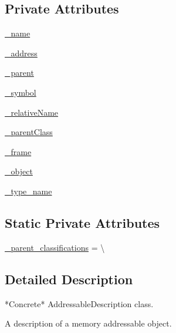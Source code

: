 \subsection*{Private Attributes}
\begin{DoxyCompactItemize}
\item 
\hyperlink{classmemoryoracle_1_1descriptions_1_1AddressableDescription_a6e606b2cd417f62a633e8388fe713815}{\+\_\+name}
\item 
\hyperlink{classmemoryoracle_1_1descriptions_1_1AddressableDescription_a2629ea28eb8de674ac1c22d1ed85c640}{\+\_\+address}
\item 
\hyperlink{classmemoryoracle_1_1descriptions_1_1AddressableDescription_afc0dda5186169a237d82c5de7cdafb8a}{\+\_\+parent}
\item 
\hyperlink{classmemoryoracle_1_1descriptions_1_1AddressableDescription_a635fff407d54c5be7078ae19ab1a70e5}{\+\_\+symbol}
\item 
\hyperlink{classmemoryoracle_1_1descriptions_1_1AddressableDescription_a621a9132072849bbf645372f7262cf5d}{\+\_\+relative\+Name}
\item 
\hyperlink{classmemoryoracle_1_1descriptions_1_1AddressableDescription_a0dfa40ff7ce8f74eacb3a603a272a720}{\+\_\+parent\+Class}
\item 
\hyperlink{classmemoryoracle_1_1descriptions_1_1AddressableDescription_a46200a5bb0d40546f0414821b1bc2a7c}{\+\_\+frame}
\item 
\hyperlink{classmemoryoracle_1_1descriptions_1_1AddressableDescription_a515398067787e3ea1a6c782d3b03e17d}{\+\_\+object}
\item 
\hyperlink{classmemoryoracle_1_1descriptions_1_1AddressableDescription_a0c63647032d370f7d04976f4651098df}{\+\_\+type\+\_\+name}
\end{DoxyCompactItemize}
\subsection*{Static Private Attributes}
\begin{DoxyCompactItemize}
\item 
\hyperlink{classmemoryoracle_1_1descriptions_1_1AddressableDescription_a086e6a539d6efb57bf98ea9e3cb52daf}{\+\_\+parent\+\_\+classifications} = \textbackslash{}
\end{DoxyCompactItemize}


\subsection{Detailed Description}
\begin{DoxyVerb}*Concrete* AddressableDescription class.

A description of a memory addressable object.
\end{DoxyVerb}
 

